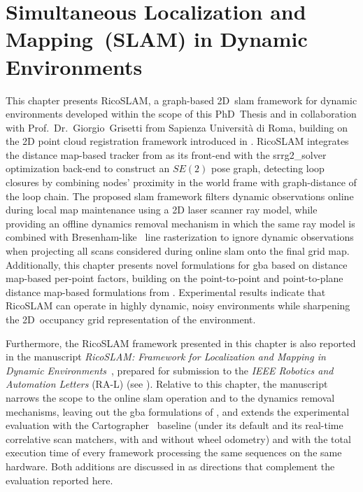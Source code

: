 \chapter{Simultaneous Localization and Mapping~(SLAM) in Dynamic Environments}\label{chap:slam}

This chapter presents RicoSLAM, a graph-based 2D~\gls{slam} framework for dynamic
environments developed within the scope of this PhD~Thesis and in collaboration
with Prof.~Dr.~Giorgio~Grisetti from Sapienza Università di Roma, building on the 2D
point cloud registration framework introduced in .
RicoSLAM integrates the distance map-based tracker from
 as its front-end with the
srrg2\_solver~\cite{grisetti:robotics:2020} optimization back-end to construct
an $SE(2)$ pose graph, detecting loop closures by combining nodes' proximity
in the world frame with graph-distance of the loop chain.
The proposed \gls{slam} framework filters dynamic observations
online during local map maintenance using a 2D laser scanner ray model,
while providing an offline dynamics removal mechanism in which
the same ray model is combined with
Bresenham-like~\cite{bresenham:ibm:1965,zingl:uas:2016} line rasterization to
ignore dynamic observations when projecting all scans considered during online
\gls{slam} onto the final grid map. Additionally, this chapter presents
novel formulations for \gls{gba} based on distance map-based per-point factors,
building on the point-to-point and point-to-plane distance map-based
formulations from .
Experimental results indicate that RicoSLAM can operate in highly dynamic,
noisy environments while sharpening the 2D~occupancy grid representation of the environment.

Furthermore, the RicoSLAM framework presented in this chapter is also reported in the
manuscript \emph{RicoSLAM: Framework for Localization and Mapping in Dynamic
Environments}~\cite{sousa:ral:2026}, prepared for submission to the
\emph{IEEE Robotics and Automation Letters} (RA-L) (see ).
Relative to this chapter, the manuscript narrows the scope to the online
\gls{slam} operation and to the dynamics removal mechanisms, leaving out the
\gls{gba} formulations of , and extends the
experimental evaluation with the Cartographer~\cite{hess:icra:2016} baseline
(under its default and its real-time correlative scan matchers, with and
without wheel odometry) and with the total execution time of every framework
processing the same sequences on the same hardware.
Both additions are discussed in  as directions
that complement the evaluation reported here.


